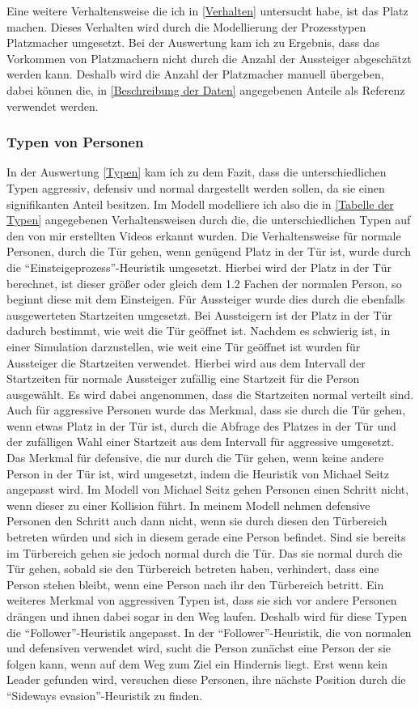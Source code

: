 Eine weitere Verhaltensweise die ich in \ref{Verhalten} untersucht habe, ist das Platz machen. Dieses Verhalten wird durch die Modellierung der Prozesstypen Platzmacher umgesetzt. Bei der Auswertung kam ich zu Ergebnis, dass das Vorkommen von Platzmachern nicht durch die Anzahl der Aussteiger abgeschätzt werden kann. Deshalb wird die Anzahl der Platzmacher manuell übergeben, dabei können die, in \ref{Beschreibung der Daten} angegebenen Anteile als Referenz verwendet werden.
\subsubsection{Typen von Personen}
In der Auswertung \ref{Typen} kam ich zu dem Fazit, dass die unterschiedlichen Typen aggressiv, defensiv und normal dargestellt werden sollen, da sie einen signifikanten Anteil besitzen. Im Modell modelliere ich also die in \ref{Tabelle der Typen} angegebenen Verhaltensweisen durch die, die unterschiedlichen Typen auf den von mir erstellten Videos erkannt wurden. Die Verhaltensweise für normale Personen, durch die Tür gehen, wenn genügend Platz in der Tür ist, wurde durch die "`Einsteigeprozess"'-Heuristik umgesetzt. Hierbei wird der Platz in der Tür berechnet, ist dieser größer oder gleich dem 1.2 Fachen der normalen Person, so beginnt diese mit dem Einsteigen. Für Aussteiger wurde dies durch die ebenfalls ausgewerteten Startzeiten umgesetzt. Bei Aussteigern ist der Platz in der Tür dadurch bestimmt, wie weit die Tür geöffnet ist. Nachdem es schwierig ist, in einer Simulation darzustellen, wie weit eine Tür geöffnet ist wurden für Aussteiger die Startzeiten verwendet. Hierbei wird aus dem Intervall der Startzeiten für normale Aussteiger zufällig eine Startzeit für die Person ausgewählt. Es wird dabei angenommen, dass die Startzeiten normal verteilt sind. Auch für aggressive Personen wurde das Merkmal, dass sie durch die Tür gehen, wenn etwas Platz in der Tür ist, durch die Abfrage des Platzes in der Tür und der zufälligen Wahl einer Startzeit aus dem Intervall für aggressive umgesetzt. Das Merkmal für defensive, die nur durch die Tür gehen, wenn keine andere Person in der Tür ist, wird umgesetzt, indem die Heuristik von Michael Seitz angepasst wird. Im Modell von Michael Seitz gehen Personen einen Schritt nicht, wenn dieser zu einer Kollision führt. In meinem Modell nehmen defensive Personen den Schritt auch dann nicht, wenn sie durch diesen den Türbereich betreten würden und sich in diesem gerade eine Person befindet. Sind sie bereits im Türbereich gehen sie jedoch normal durch die Tür. Das sie normal durch die Tür gehen, sobald sie den Türbereich betreten haben, verhindert, dass eine Person stehen bleibt, wenn eine Person nach ihr den Türbereich betritt. Ein weiteres Merkmal von aggressiven Typen ist, dass sie sich vor andere Personen drängen und ihnen dabei sogar in den Weg laufen. Deshalb wird für diese Typen die "`Follower"'-Heuristik angepasst. In der "`Follower"'-Heuristik, die von normalen und defensiven verwendet wird, sucht die Person zunächst eine Person der sie folgen kann, wenn auf dem Weg zum Ziel ein Hindernis liegt. Erst wenn kein Leader gefunden wird, versuchen diese Personen, ihre nächste Position durch die "`Sideways evasion"'-Heuristik zu finden. 